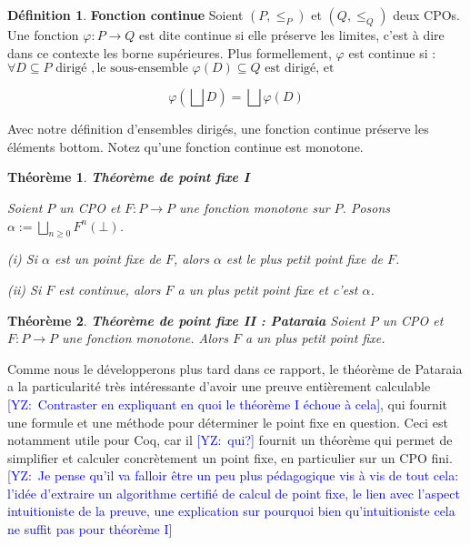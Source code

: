 \documentclass{article}
\newcommand{\yz}[1]{\textcolor{blue}{{[YZ:~#1]}}}
\newtheorem{theorem}{Théorème}[section]
\theoremstyle{definition}
\newtheorem{definition}{Définition}[section]
\begin{document}
\begin{definition}{\textbf{Fonction continue}}
Soient $(P, \leq_P)$ et $(Q, \leq_Q)$ deux CPOs. Une fonction $\varphi : P \rightarrow Q$ est dite continue si elle préserve les limites, c'est à dire dans ce contexte les borne supérieures. Plus formellement, $\varphi$ est continue si :
$\forall D \subseteq P \text{ dirigé }, \text{le sous-ensemble } \varphi(D) \subseteq Q \text{ est dirigé, et }$

$$ \varphi(\bigsqcup D) = \bigsqcup \varphi(D) $$ 

Avec notre définition d'ensembles dirigés, une fonction continue préserve les éléments bottom.
Notez qu'une fonction continue est monotone.
\end{definition}

\begin{theorem}{\textbf{Théorème de point fixe I}}

Soient $P$ un CPO et $F : P \rightarrow P$ une fonction monotone sur $P$. Posons $\alpha := \bigsqcup_{n \geq 0}F^n(\bot)$.

(i) Si $\alpha$ est un point fixe de $F$, alors $\alpha$ est le plus petit point fixe de $F$.

(ii) Si $F$ est continue, alors $F$ a un plus petit point fixe et c'est $\alpha$.

\end{theorem}

\begin{theorem}{\textbf{Théorème de point fixe II : Pataraia}}
Soient $P$ un CPO et $F : P \rightarrow P$ une fonction monotone. Alors $F$ a un plus petit point fixe.
\end{theorem}

Comme nous le développerons plus tard dans ce rapport, le théorème de Pataraia a
la particularité très intéressante d'avoir une preuve entièrement calculable
\yz{Contraster en expliquant en quoi le théorème I échoue à cela}, qui fournit une formule et une méthode pour déterminer le point fixe en question. %
Ceci est notamment utile pour Coq, car il \yz{qui?} fournit un théorème qui
permet de simplifier et calculer concrètement un point fixe, en particulier sur
un CPO fini. \yz{Je pense qu'il va falloir être un peu plus pédagogique vis à
  vis de tout cela: l'idée d'extraire un algorithme certifié de calcul de point
  fixe, le lien avec l'aspect intuitioniste de la preuve, une explication sur
  pourquoi bien qu'intuitioniste cela ne suffit pas pour théorème I}
\end{document}

